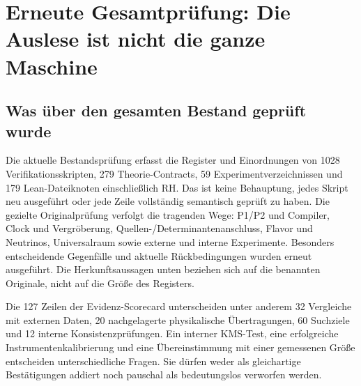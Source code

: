 \section*{Erneute Gesamtprüfung: Die Auslese ist nicht die ganze Maschine}
\label{sec:sourcedirectionaudit}


\subsection*{Was über den gesamten Bestand geprüft wurde}
Die aktuelle Bestandsprüfung erfasst die Register und Einordnungen von 1028 Verifikationsskripten, 279 Theorie-Contracts, 59 Experimentverzeichnissen und 179 Lean-Dateiknoten einschließlich RH. Das ist keine Behauptung, jedes Skript neu ausgeführt oder jede Zeile vollständig semantisch geprüft zu haben. Die gezielte Originalprüfung verfolgt die tragenden Wege: P1/P2 und Compiler, Clock und Vergröberung, Quellen-/Determinantenanschluss, Flavor und Neutrinos, Universalraum sowie externe und interne Experimente. Besonders entscheidende Gegenfälle und aktuelle Rückbedingungen wurden erneut ausgeführt. Die Herkunftsaussagen unten beziehen sich auf die benannten Originale, nicht auf die Größe des Registers.

Die 127 Zeilen der Evidenz-Scorecard unterscheiden unter anderem 32 Vergleiche mit externen Daten, 20 nachgelagerte physikalische Übertragungen, 60 Suchziele und 12 interne Konsistenzprüfungen. Ein interner KMS-Test, eine erfolgreiche Instrumentenkalibrierung und eine Übereinstimmung mit einer gemessenen Größe entscheiden unterschiedliche Fragen. Sie dürfen weder als gleichartige Bestätigungen addiert noch pauschal als bedeutungslos verworfen werden.

